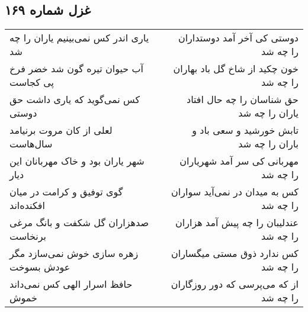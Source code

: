 \begin{center}
\section*{غزل شماره ۱۶۹}
\label{sec:sh169}
\begin{longtable}{l p{0.5cm} r}
یاری اندر کس نمی‌بینیم یاران را چه شد
&&
دوستی کی آخر آمد دوستداران را چه شد
\\
آب حیوان تیره گون شد خضر فرخ پی کجاست
&&
خون چکید از شاخ گل باد بهاران را چه شد
\\
کس نمی‌گوید که یاری داشت حق دوستی
&&
حق شناسان را چه حال افتاد یاران را چه شد
\\
لعلی از کان مروت برنیامد سال‌هاست
&&
تابش خورشید و سعی باد و باران را چه شد
\\
شهر یاران بود و خاک مهربانان این دیار
&&
مهربانی کی سر آمد شهریاران را چه شد
\\
گوی توفیق و کرامت در میان افکنده‌اند
&&
کس به میدان در نمی‌آید سواران را چه شد
\\
صدهزاران گل شکفت و بانگ مرغی برنخاست
&&
عندلیبان را چه پیش آمد هزاران را چه شد
\\
زهره سازی خوش نمی‌سازد مگر عودش بسوخت
&&
کس ندارد ذوق مستی میگساران را چه شد
\\
حافظ اسرار الهی کس نمی‌داند خموش
&&
از که می‌پرسی که دور روزگاران را چه شد
\\
\end{longtable}
\end{center}
